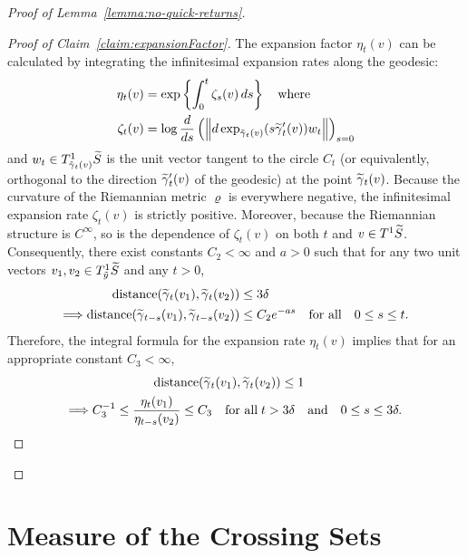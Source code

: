 \documentclass[10pt]{amsart}
\theoremstyle{definition}\newtheorem{defi}[theo]{Definition}\newtheorem{rema}[theo]{Remark}\newtheorem{exam}[theo]{Example}\newtheorem{exem}[theo]{Example}\newtheorem{nota}[theo]{Notation}
\newcommand{\xset}[1]{\left\{ #1 \right\}}
\DeclareMathOperator{\distance}{distance}
\let\oldtilde\tilde
\renewcommand*{\tilde}[1]{\mathchoice{\widetilde{#1}}{\widetilde{#1}}{\oldtilde{#1}}{\oldtilde{#1}}}\let\oldforall\forall
\renewcommand*{\forall}{\mathrel{\oldforall}}
\begin{document}
\begin{proof}[Proof of Lemma~\ref{lemma:no-quick-returns}]
\begin{proof}[Proof of Claim~\ref{claim:expansionFactor}]
The expansion factor $\eta_{t}(v)$ can be calculated by integrating the infinitesimal expansion rates along the geodesic:
\begin{align*}
\eta_{t}(v)&= \exp \xset {\int_{0}^{t} \zeta _{s}(v) \, ds }\quad \text{where} \\
\zeta_{t}(v)&= \log \frac{d}{ds}
\left(\left\|d\exp_{\tilde{\gamma}_{t}(v)} (s \tilde{\gamma}_{t}'(v))w_{t}\right\|\right)_{s=0}
\end{align*}
and $w_{t}\in T^{1}_{\tilde{\gamma}_{t}(v)}\tilde{S}$ is the unit vector tangent to the circle $C_{t}$ (or equivalently, orthogonal to the direction $\tilde{\gamma}_{t}'(v)$ of the geodesic) at the point $\tilde{\gamma}_{t}(v)$. Because the curvature of the Riemannian metric ${\varrho}$ is everywhere negative, the infinitesimal expansion rate $\zeta_{t}(v)$ is strictly positive. Moreover, because the Riemannian structure is $C^{\infty}$, so is the dependence of $\zeta_{t}(v)$ on both $t$ and $v \in T^{1}\tilde{S}$. Consequently, there exist constants $C_{2}<\infty$ and $a>0$ such that for any two unit vectors $v_{1}, v_{2}\in T^{1}_{\tilde{y}}\tilde{S}$ and any $t>0$,
\begin{align*}
\distance(\tilde{\gamma}_{t}(v_{1}),\tilde{\gamma}_{t}(v_{2})) &\leq 3\delta \\
\Longrightarrow\distance(\tilde{\gamma}_{t-s}(v_{1}),\tilde{\gamma}_{t-s}(v_{2})) &\leq C_{2}e^{-as} \quad \text{for all} \quad 0 \leq s \leq t.
\end{align*}
Therefore, the integral formula for the expansion rate $\eta_{t}(v)$ implies that for an appropriate constant $C_{3}<\infty$,
\begin{multline*}
\distance (\tilde{\gamma}_{t}(v_{1}),\tilde{\gamma}_{t}(v_{2})) \leq 1
\quad\\
\Longrightarrow C_{3}^{-1}\leq \frac{\eta_{t}(v_{1})}{\eta_{t-s}(v_{2})} \leq C_{3} \quad \text{for all} \; t>3\delta \quad \text{and}\quad 0\leq s \leq 3\delta.\qedhere
\end{multline*}
\end{proof}\let\qed\relax
\end{proof}



\section{Measure of the Crossing Sets}\label{sec:asymptotics}
\end{document}
